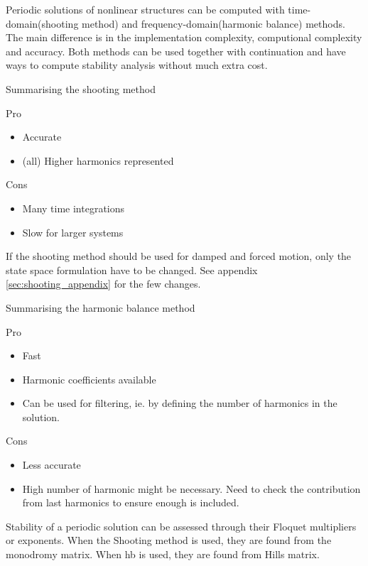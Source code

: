 Periodic solutions of nonlinear structures can be computed with
time-domain(shooting method) and frequency-domain(harmonic balance) methods. The
main difference is in the implementation complexity, computional complexity and
accuracy. Both methods can be used together with continuation and have ways to compute
stability analysis without much extra cost.

Summarising the shooting method
\begin{multicols}{2}
  Pro
  \begin{itemize}
  \item Accurate
  \item (all) Higher harmonics represented
  \end{itemize}
  \columnbreak
  Cons
  \begin{itemize}
  \item Many time integrations
  \item Slow for larger systems
  \end{itemize}
\end{multicols}
If the shooting method should be used for damped and forced motion, only the
state space formulation have to be changed. See appendix
\ref{sec:shooting_appendix} for the few changes.

Summarising the harmonic balance method
\begin{multicols}{2}
  Pro
  \begin{itemize}
  \item Fast
  \item Harmonic coefficients available
  \item Can be used for filtering, ie. by defining the number of harmonics in
    the solution.
  \end{itemize}
  \columnbreak
  Cons
  \begin{itemize}
  \item Less accurate
  \item High number of harmonic might be necessary. Need to check the
    contribution from last harmonics to ensure enough is included.
  \end{itemize}
\end{multicols}


Stability of a periodic solution can be assessed through  their Floquet
multipliers or exponents. When the Shooting method is used, they are found from
the monodromy matrix. When \gls{hb} is used, they are found from Hills matrix.


